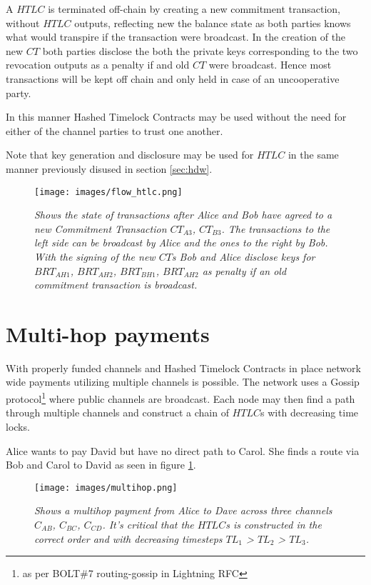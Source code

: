 A $HTLC$ is terminated off-chain by creating a new commitment transaction, without $HTLC$ outputs, reflecting new the balance state as both parties knows what would transpire if the transaction were broadcast. In the creation of the new $CT$ both parties disclose the both the private keys corresponding to the two revocation outputs as a penalty if and old $CT$ were broadcast. Hence most transactions will be kept off chain and only held in case of an uncooperative party.

In this manner Hashed Timelock Contracts may be used without the need for either of the channel parties to trust one another.

Note that key generation and disclosure may be used for $HTLC$ in the same manner previously disused in section \ref{sec:hdw}.

\newpage
\onecolumn

\begin{figure}[!htb]

	\centering
	\texttt{[image: images/flow\_htlc.png]}

	\caption{\textit{
			Shows the state of transactions after Alice and Bob have agreed to a new Commitment Transaction $CT_{A3}$, $CT_{B3}$. 
			The transactions to the left side can be broadcast by Alice and the ones to the right by Bob. With the signing of the new $CT$s
			Bob and Alice disclose keys for $BRT_{AH1}$, $BRT_{AH2}$, $BRT_{BH1}$, $BRT_{AH2}$ as penalty if an old commitment transaction is broadcast.
		}}
\end{figure}
\newpage
\twocolumn

\section{Multi-hop payments} 

With properly funded channels and Hashed Timelock Contracts in place network wide payments utilizing multiple channels is possible.
The network uses a Gossip protocol\footnote{as per BOLT\#7 routing-gossip in Lightning RFC\cite{repository:lightning:rfc}} where
public channels are broadcast. Each node may then find a path through multiple channels and construct a chain of $HTLC$s with decreasing time locks.

Alice wants to pay David but have no direct path to Carol. She finds a route via Bob and Carol to David as seen in figure \ref{fig:multihop}.

\begin{figure}[!htb]

	\centering
	\texttt{[image: images/multihop.png]}

	\caption{\textit{
			Shows a multihop payment from Alice to Dave across three channels $C_{AB}$, $C_{BC}$, $C_{CD}$. It's critical that the $HTLC$s is constructed in the correct order and with decreasing timesteps $TL_{1}$ > $TL_{2}$ > $TL_{3}$.
		}}
	\label{fig:multihop}

\end{figure}

